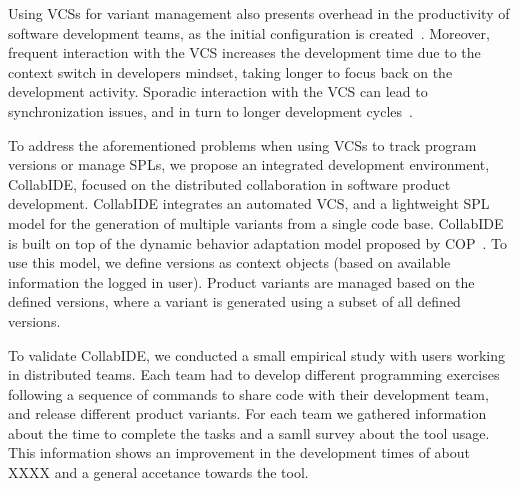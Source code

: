 Using \acp{VCS} for variant management also presents overhead in the productivity of software development teams, as the initial configuration is created~\cite{niu14}.
Moreover, frequent interaction with the \ac{VCS} increases the development time due to the context switch in developers mindset, taking longer to focus back on the development activity. Sporadic interaction with the \ac{VCS} can lead to synchronization issues, and in turn to longer development cycles~\cite{7}.  

To address the aforementioned problems when using \acp{VCS} to track program versions or manage \acp{SPL}, we propose an integrated development environment, CollabIDE, focused on the distributed  collaboration in software product development. CollabIDE integrates an automated \ac{VCS}, and a lightweight \ac{SPL} model for the generation of multiple variants from a single code base. 
CollabIDE is built on top of the dynamic behavior adaptation model proposed by \ac{COP}~\cite{salvaneschi13taas}. To use this model, we define versions as context objects (based on available information \eg the logged in user).
Product variants are managed based on the defined versions, where a variant is generated using a subset of all defined versions.

To validate CollabIDE, we conducted a small empirical study with users 
working in distributed teams. Each team had to develop different programming exercises following a sequence of commands to share code with their development team, and release different product variants. For each team we gathered information about the time to complete the tasks and a samll survey about the tool usage. This information shows an improvement in the development times of about XXXX and a general accetance towards the tool.
 



\endinput

With CollabIDE, we aim to solve the overhead problems that exists in these development models with 
features that aim to reduce the time developers must spend doing actions related to version control or 
setting up a project that uses \acp{SPL}.
